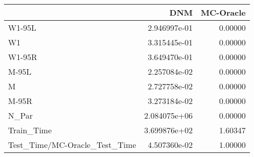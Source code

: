 \begin{tabular}{lrr}
\toprule
{} &           DNM &  MC-Oracle \\
\midrule
W1-95L                        &  2.946997e-01 &    0.00000 \\
W1                            &  3.315445e-01 &    0.00000 \\
W1-95R                        &  3.649470e-01 &    0.00000 \\
M-95L                         &  2.257084e-02 &    0.00000 \\
M                             &  2.727758e-02 &    0.00000 \\
M-95R                         &  3.273184e-02 &    0.00000 \\
N\_Par                         &  2.084075e+06 &    0.00000 \\
Train\_Time                    &  3.699876e+02 &    1.60347 \\
Test\_Time/MC-Oracle\_Test\_Time &  4.507360e-02 &    1.00000 \\
\bottomrule
\end{tabular}
